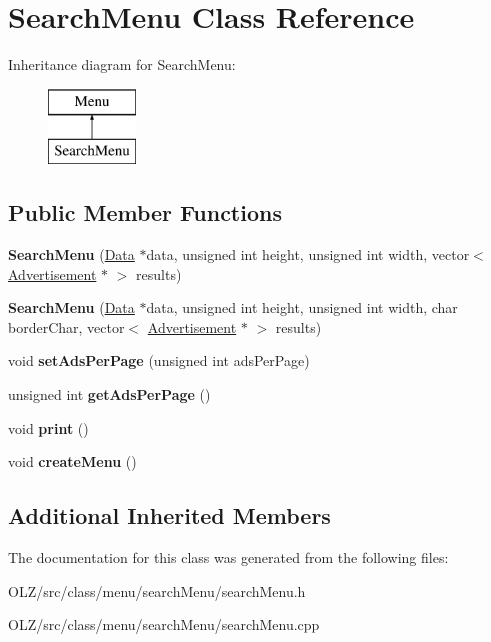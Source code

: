 \hypertarget{class_search_menu}{}\section{Search\+Menu Class Reference}
\label{class_search_menu}
Inheritance diagram for Search\+Menu\+:\begin{figure}[H]
\begin{center}
\leavevmode
\includegraphics[height=2.000000cm]{class_search_menu}
\end{center}
\end{figure}
\subsection*{Public Member Functions}
\begin{DoxyCompactItemize}
\item 
\hypertarget{class_search_menu_a0aed12cbb98fcb864c9eef3b03234469}{}{\bfseries Search\+Menu} (\hyperlink{class_data}{Data} $\ast$data, unsigned int height, unsigned int width, vector$<$ \hyperlink{class_advertisement}{Advertisement} $\ast$ $>$ results)\label{class_search_menu_a0aed12cbb98fcb864c9eef3b03234469}

\item 
\hypertarget{class_search_menu_a8a5fe2f0aa758edb5e5a809d194fc56e}{}{\bfseries Search\+Menu} (\hyperlink{class_data}{Data} $\ast$data, unsigned int height, unsigned int width, char border\+Char, vector$<$ \hyperlink{class_advertisement}{Advertisement} $\ast$ $>$ results)\label{class_search_menu_a8a5fe2f0aa758edb5e5a809d194fc56e}

\item 
\hypertarget{class_search_menu_a506fce847fc8201ccc63d3fbc2ede3b8}{}void {\bfseries set\+Ads\+Per\+Page} (unsigned int ads\+Per\+Page)\label{class_search_menu_a506fce847fc8201ccc63d3fbc2ede3b8}

\item 
\hypertarget{class_search_menu_a39156ea5dcb600c0bf12eadc503f7268}{}unsigned int {\bfseries get\+Ads\+Per\+Page} ()\label{class_search_menu_a39156ea5dcb600c0bf12eadc503f7268}

\item 
\hypertarget{class_search_menu_a4fbc2741c5d72f4fe7473e5de5a5d14e}{}void {\bfseries print} ()\label{class_search_menu_a4fbc2741c5d72f4fe7473e5de5a5d14e}

\item 
\hypertarget{class_search_menu_a97f499b313e88142590aa51c2ef82f3d}{}void {\bfseries create\+Menu} ()\label{class_search_menu_a97f499b313e88142590aa51c2ef82f3d}

\end{DoxyCompactItemize}
\subsection*{Additional Inherited Members}


The documentation for this class was generated from the following files\+:\begin{DoxyCompactItemize}
\item 
O\+L\+Z/src/class/menu/search\+Menu/search\+Menu.\+h\item 
O\+L\+Z/src/class/menu/search\+Menu/search\+Menu.\+cpp\end{DoxyCompactItemize}
